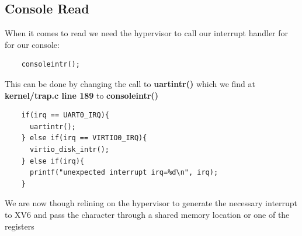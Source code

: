 \newpage
\subsection{Console Read}
\label{imp:console-read}

When it comes to read we need the hypervisor to call our interrupt handler for for our console:

\begin{verbatim}
    consoleintr();
\end{verbatim}

This can be done by changing the call to \textbf{uartintr()} which we find at \textbf{kernel/trap.c line 189} to \textbf{consoleintr()}
\begin{verbatim}
    if(irq == UART0_IRQ){
      uartintr();
    } else if(irq == VIRTIO0_IRQ){
      virtio_disk_intr();
    } else if(irq){
      printf("unexpected interrupt irq=%d\n", irq);
    }
\end{verbatim}

We are now though relining on the hypervisor to generate the necessary interrupt to XV6  and pass the character through a shared memory location or one of the registers

